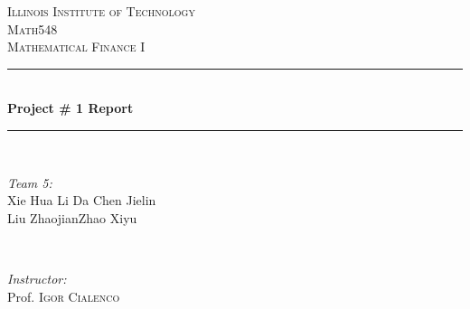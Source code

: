 \documentclass[12pt]{article}
\begin{document}
\begin{titlepage}

\newcommand{\HRule}{\rule{\linewidth}{0.5mm}} %

\center %
 

\textsc{\LARGE Illinois Institute of Technology}\\[1.5cm] %
\textsc{\Large Math548 }\\[0.5cm] %
\textsc{\large Mathematical Finance I}\\[0.5cm] %


\HRule \\[0.4cm]
{ \huge \bfseries Project \# 1 Report}\\[0.3cm] %
\HRule \\[1.5cm]
 

\begin{minipage}{0.4\textwidth}
\begin{flushleft} \large
\emph{Team 5:}\\
Xie Hua \quad Li Da \quad Chen Jielin \\
Liu Zhaojian\quad Zhao Xiyu\\
\end{flushleft}
\end{minipage}
~
\begin{minipage}{0.4\textwidth}
\begin{flushright} \large
\emph{Instructor:} \\
Prof. \textsc{Igor Cialenco} %
\end{flushright}
\end{minipage}\\[4cm]


\end{titlepage}
\end{document}
